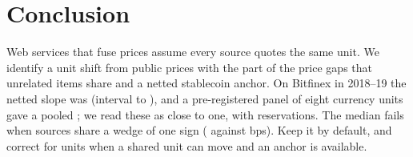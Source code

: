 \documentclass[sigconf,review,anonymous]{acmart}
\begin{document}
\section{Conclusion}
\label{sec:conclusion}
Web services that fuse prices assume every source quotes the same unit. We identify a unit shift from public prices with
the part of the price gaps that unrelated items share and a netted stablecoin anchor. On Bitfinex in 2018--19 the netted slope was \NumKStressDaySlopeAdj{}
(interval \NumKStressDaySlopeAdjMoLo{} to \NumKStressDaySlopeAdjMoHi{}), and a pre-registered panel of eight currency units
gave a pooled \NumPNPooledStressLam{}; we read these as close to one, with reservations. The median fails when sources
share a wedge of one sign (\NumPFFusMOMae{} against \NumPFFusMAMae{} bps). Keep it by default, and correct for units when a
shared unit can move and an anchor is available.

\FloatBarrier
{\let\small\footnotesize

}

\appendix
\setlength{\textfloatsep}{8pt plus 2pt minus 2pt}\setlength{\floatsep}{8pt plus 2pt minus 2pt}\setlength{\intextsep}{8pt plus 2pt minus 2pt}
\renewcommand{\dbltopfraction}{0.95}\renewcommand{\textfraction}{0.1}
\small\renewcommand{\arraystretch}{0.85}
\end{document}
